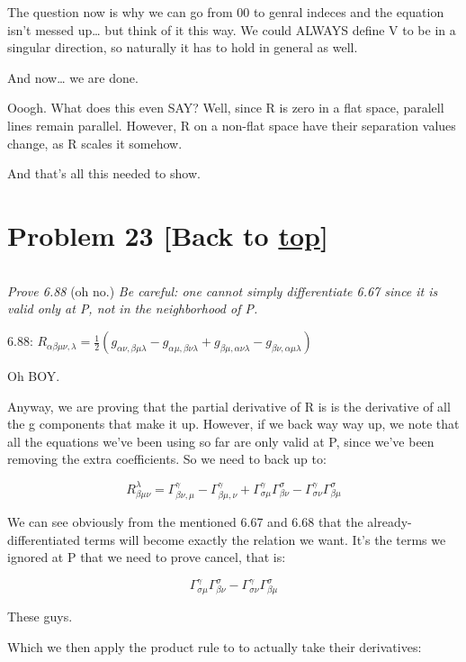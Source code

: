 \documentclass[landscape,letterpaper,10pt,english]{article}
\begin{document}
The question now is why we can go from 00 to genral indeces and the
equation isn't messed up\ldots{} but think of it this way. We could
ALWAYS define V to be in a singular direction, so naturally it has to
hold in general as well.

And now\ldots{} we are done.

Ooogh. What does this even SAY? Well, since R is zero in a flat space,
paralell lines remain parallel. However, R on a non-flat space have
their separation values change, as R scales it somehow.

And that's all this needed to show.

    \hypertarget{problem-23-back-to-top}{%
\section{\texorpdfstring{Problem 23 {[}Back to
\hyperref[toc]{top}{]}}{Problem 23 {[}Back to {]}}}\label{problem-23-back-to-top}}

\[\label{P23}\]

\emph{Prove 6.88} (oh no.) \emph{Be careful: one cannot simply
differentiate 6.67 since it is valid only at P, not in the neighborhood
of P.}

6.88:
\(R_{\alpha\beta\mu\nu,\lambda} = \frac12 (g_{\alpha\nu,\beta\mu\lambda} - g_{\alpha\mu,\beta\nu\lambda} + g_{\beta\mu,\alpha\nu\lambda} - g_{\beta\nu,\alpha\mu\lambda})\)

Oh BOY.

    Anyway, we are proving that the partial derivative of R is is the
derivative of all the g components that make it up. However, if we back
way way up, we note that all the equations we've been using so far are
only valid at P, since we've been removing the extra coefficients. So we
need to back up to:

\[ R^\lambda_{\beta\mu\nu} = \Gamma^\gamma_{\beta\nu,\mu} - \Gamma^\gamma_{\beta\mu,\nu} + \Gamma^\gamma_{\sigma\mu} \Gamma^\sigma_{\beta\nu} - \Gamma^\gamma_{\sigma\nu} \Gamma^\sigma_{\beta\mu}  \]

We can see obviously from the mentioned 6.67 and 6.68 that the
already-differentiated terms will become exactly the relation we want.
It's the terms we ignored at P that we need to prove cancel, that is:

\[ \Gamma^\gamma_{\sigma\mu} \Gamma^\sigma_{\beta\nu} - \Gamma^\gamma_{\sigma\nu} \Gamma^\sigma_{\beta\mu}  \]

These guys.

    Which we then apply the product rule to to actually take their
derivatives:
\end{document}
